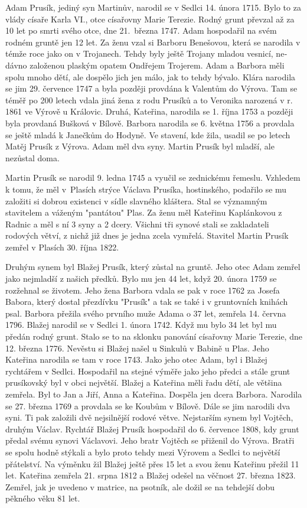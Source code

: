 \documentclass[../dejiny-rodu-prusiku.tex]{subfiles}
\begin{document}
Adam Prusík, jediný syn Martinův, narodil se v Sedlci 14. února 1715. Bylo to za vlády císaře Karla VI., otce císařovny Marie Terezie. Rodný grunt převzal až za 10 let po smrti svého otce, dne 21.~března 1747. Adam hospodařil na svém rodném gruntě jen 12 let. Za ženu vzal si Barboru Benešovou, která se narodila v témže roce jako on v Trojanech. Tehdy byly ještě Trojany mladou vesnicí, ne­dávno založenou plaským opatem Ondřejem Trojerem. Adam a Barbora měli spolu mnoho dětí, ale dospělo jich jen málo, jak to tehdy bývalo. Klára narodila se jim 29. červen­ce 1747 a byla později provdána k Valentům do Výrova. Tam se téměř po 200 letech vdala jiná žena z rodu Prusíků a to Veronika narozená v r. 1861 ve Výrově u Královic. Druhá, Kateřina, narodila se 1. října 1753 a později byla provdaná Bušková v Bílově. Barbora narodila se 6. května 1756 a provdala se ještě mladá k Janečkům do Hodyně. Ve stavení, kde žila, usadil se po letech Matěj Prusík z Vý­rova. Adam měl dva syny. Martin Prusík byl mladší, ale nezůstal doma.

Martin Prusík se narodil 9. ledna 1745 a vyučil se zednickému řemeslu. Vzhledem k tomu, že měl v~Plasích strýce Václava Prusíka, hostinského, podařilo se
mu založiti si dobrou existenci v sídle slavného kláštera. Stal se významným stavitelem a váženým "pantátou" Plas. Za ženu měl Kateřinu Kaplánkovou z Radnic a měl s ní 3 syny a 2 dcery. Všichni tři sy­nové stali se zakladateli rodových větví, z nichž již dnes je jedna zcela vymřelá. Stavitel Martin Prusík zemřel v Plasích 30. října 1822.

Druhým synem byl Blažej Prusík, který zůstal na gruntě. Jeho otec Adam zemřel jako nejmladší z našich předků. Bylo mu jen 44 let, když 20. února 1759 se rozžehnal se životem. Jeho žena Barbora vdala se pak v roce 1762 za Josefa Babora, který dostal přezdívku "Prusík" a tak se také i v gruntovních knihách psal. Barbora přežila svého prvního muže Adama o 37 let, zemřela 14. června 1796. Blažej narodil se v Sedlci 1. úno­ra 1742. Když mu bylo 34 let byl mu předán rodný grunt. Stalo se to na sklonku panování císařovny Marie Terezie, dne 12. března 1776. Nevěstu si Blažej našel u Sinkulů v Babině u Plas. Jeho Kateřina narodila se tam v roce 1743. Jako jeho otec Adam, byl i Blažej rychtářem v Sedlci. Hospodařil na stejné výměře jako jeho předci a stále grunt prusíkovský byl v obci největší. Blažej a Kateřina měli řadu dětí, ale většina zemřela. Byl to Jan a Jiří, Anna a Kateřina.  Dospěla jen dcera Barbora. Narodila se 27. března 1769 a provdala se ke Koubům v Bílově. Dále se jim narodili dva syni. Ti pak založili dvě nejsilnější rodové větve. Nejstarším synem byl Vojtěch, druhým Václav. Rychtář Blažej Prusík hospodařil do 6. července 1808, kdy grunt předal svému synovi Václavovi. Jeho bratr Vojtěch se přiženil do Výrova. Bratři se spolu hodně stýkali a bylo proto tehdy mezi Výrovem a Sedlci to největší přátelství. Na výměnku žil Blažej ještě přes 15 let a svou ženu Kateřinu přežil 11 let. Kateřina zemřela 21. srpna 1812 a Blažej odešel na věčnost 27. března 1823. Zemřel, jak je uvedeno v matrice, na psotník, ale dožil se na tehdej­ší dobu pěkného věku 81 let.
\end{document}
